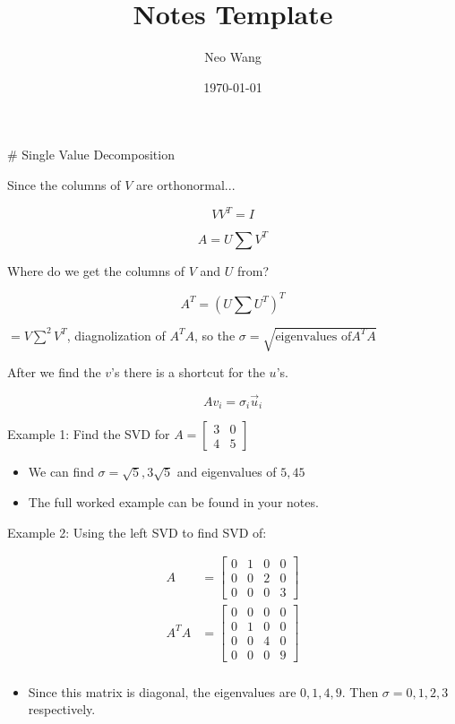 \documentclass{article}
\title{Notes Template}
\author{Neo Wang}
\date{\today}
\begin{document}
\maketitle
\tableofcontents

\begin{markdown}

# Single Value Decomposition

Since the columns of $V$ are orthonormal...

$$VV^T=I$$

$$A = U\sum V^T$$

Where do we get the columns of $V$ and $U$ from?

$$A^T = (U\sum U^T)^T$$

$=V\sum^2 V^T$, diagnolization of $A^TA$, so the $\sigma=\sqrt{\text{eigenvalues of}A^TA}$

\end{markdown}

After we find the $v$'s there is a shortcut for the $u$'s.

$$Av_i=\sigma_i\vec{u}_i$$

Example 1: Find the SVD for $A = \begin{bmatrix}
    3&0\\4&5
\end{bmatrix}$

\begin{itemize}
\item We can find $\sigma = \sqrt{5}, 3\sqrt{5}$ and eigenvalues of $5, 45$
\item The full worked example can be found in your notes.
\end{itemize}

Example 2: Using the left SVD to find SVD of:

$$
\begin{align*}
    A &= 
    \begin{bmatrix}
        0&1&0&0\\0&0&2&0\\0&0&0&3
    \end{bmatrix} \\
    A^TA &=
    \begin{bmatrix}
    0&0&0&0\\0&1&0&0\\0&0&4&0\\0&0&0&9
    \end{bmatrix} \\
\end{align*}
$$

\begin{itemize}
    \item Since this matrix is diagonal, the eigenvalues are $0, 1, 4, 9$. Then $\sigma=0,1,2,3$ respectively.
\end{itemize}
\end{document}
